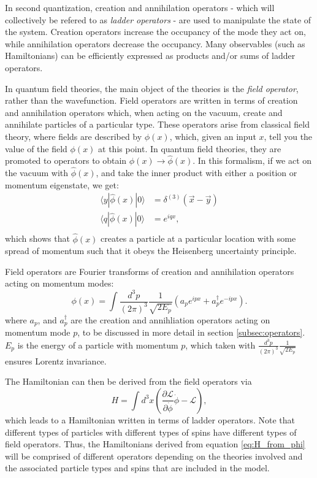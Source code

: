 In second quantization, creation and annihilation operators - which will collectively be refered to as \emph{ladder operators} - are used to manipulate the state of the system.
Creation operators increase the occupancy of the mode they act on, while annihilation operators decrease the occupancy.
Many observables (such as Hamiltonians) can be efficiently expressed as products and/or sums of ladder operators.  

In quantum field theories, the main object of the theories is the \textit{field operator}, rather than the wavefunction. Field operators are written in terms of creation and annihilation operators which, when acting on the vacuum, create and annihilate particles of a particular type. 
These operators arise from classical field theory, where fields are described by $\phi(x)$, which, given an input $x$, tell you the value of the field $\phi(x)$  at this point. In quantum field theories, they are promoted to operators to obtain $\phi(x) \rightarrow \hat{\phi}(x)$.
In this formalism, if we act on the vacuum with $\hat{\phi}(x)$, and take the inner product with either a position or momentum eigenstate, we get:
\begin{align}
    \langle y|\hat{\phi}(x)|0\rangle &= \delta^{(3)}(\vec{x} - \vec{y}) \\ \nonumber
    \langle q|\hat{\phi}(x)|0\rangle &= e^{iqx}, \\
\end{align}
which shows that $\hat{\phi}(x)$ creates a particle at a particular location with some spread of momentum such that it obeys the Heisenberg uncertainty principle.

Field operators are Fourier transforms of creation and annihilation operators acting on momentum modes: 
\begin{equation}
    \phi(x) = \int \frac{d^3p}{(2\pi)^3}\frac{1}{\sqrt{2E_p}}\left(a_p e^{ipx} + a_p^\dagger e^{-ipx}\right).
\end{equation}
where $a_p$, and $a_p^\dagger$ are the creation and annihliation operators acting on momentum mode $p$, to be discussed in more detail in section \ref{subsec:operators}.
$E_p$ is the energy of a particle with momentum $p$, which taken with $\frac{d^3p}{(2\pi)^3}\frac{1}{\sqrt{2E_p}}$ ensures Lorentz invariance. 

The Hamiltonian can then be derived from the field operators via 
\begin{equation}
    \label{eq:H_from_phi}
    H = \int d^3x \left(\frac{\partial \mathcal{L}}{\partial \dot{\phi}}\dot{\phi} - \mathcal{L} \right),
\end{equation}
which leads to a Hamiltonian written in terms of ladder operators.
Note that different types of particles with different types of spins have different types of field operators.
Thus, the Hamiltonians derived from equation \ref{eq:H_from_phi} will be comprised of different operators depending on the theories involved and the associated particle types and spins that are included in the model. 

